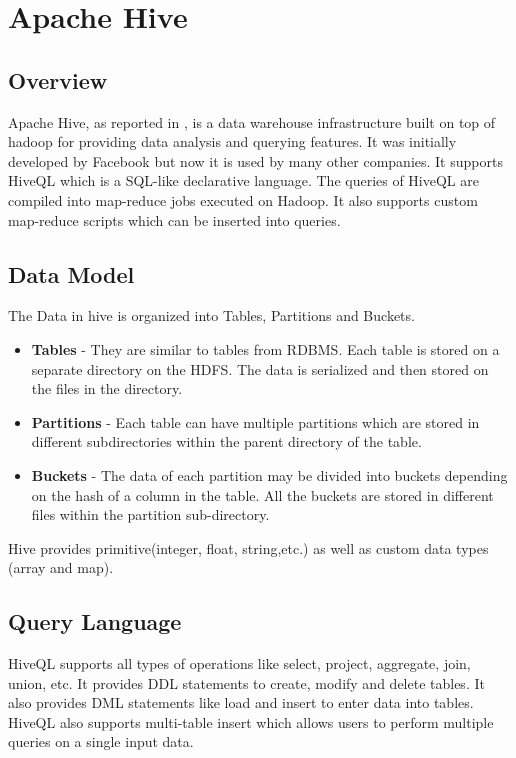 \documentclass[12pt]{book}
\begin{document}
\chapter{Apache Hive}
\section{Overview}
Apache Hive, as reported in \cite{Hive} , is a data warehouse infrastructure built on top of hadoop for providing data analysis and querying features. It was initially 
developed by Facebook but now it is used by many other companies. It supports HiveQL which is a SQL-like declarative language. The queries of
HiveQL are compiled into map-reduce jobs executed on Hadoop. It also supports custom map-reduce scripts which can be inserted into queries.
\section{Data Model}
The Data in hive is organized into Tables, Partitions and Buckets.
\begin{itemize}
 \item \textbf{Tables} - They are similar to tables from RDBMS. Each table is stored on a separate directory on the HDFS. The data is 
 serialized and then stored on the files in the directory.
 \item \textbf{Partitions} - Each table can have multiple partitions which are stored in different subdirectories within the parent directory
 of the table.
 \item \textbf{Buckets} - The data of each partition may be divided into buckets depending on the hash of a column in the table.
 All the buckets are stored in different files within the partition sub-directory.
\end{itemize}
Hive provides primitive(integer, float, string,etc.) as well as custom data types (array and map).
\section{Query Language}
HiveQL supports all types of operations like select, project, aggregate, join, union, etc.
It provides DDL statements to create, modify and delete tables. It also provides DML statements like load and insert to enter data into
tables. HiveQL also supports multi-table insert which allows users to perform multiple queries on a single input data.
\end{document}
